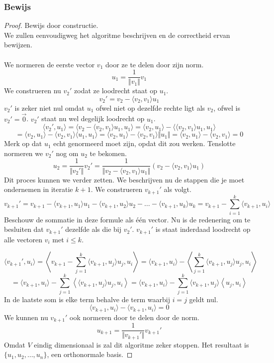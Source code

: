 \documentclass[lineaire_algebra_oplossingen.tex]{subfiles}
\begin{document}
\subsubsection*{Bewijs}
\begin{proof}
Bewijs door constructie.\\
We zullen eenvoudigweg het algoritme beschrijven en de correctheid ervan bewijzen.\\\\
We normeren de eerste vector $v_1$ door ze te delen door zijn norm.
\[
u_1 = \frac{1}{\Vert v_1\Vert}v_1
\]
We construeren nu $v_2'$ zodat ze loodrecht staat op $u_1$.
\[
v_2' = v_2 - \langle v_2,v_1\rangle u_1
\]
$v_2'$ is zeker niet nul omdat $u_1$ ofwel niet op dezelfde rechte ligt als $v_2$, ofwel is $v_2' = \vec{0}$. $v_2'$ staat nu wel degelijk loodrecht op $u_1$.
\[
\langle v_2',u_1\rangle = \langle v_2 - \langle v_2,v_1\rangle u_1,u_1\rangle = \langle v_2,u_1\rangle - \langle\langle v_2,v_1\rangle u_1,u_1\rangle
\]
\[
= \langle v_2,u_1\rangle - \langle v_2,v_1\rangle \langle u_1,u_1\rangle = \langle v_2,u_1\rangle - \langle v_2,v_1\rangle \Vert u_1\Vert = \langle v_2,u_1\rangle - \langle v_2,v_1\rangle = 0
\]
Merk op dat $u_1$ echt genormeerd moet zijn, opdat dit zou werken. Tenslotte normeren we $v_2'$ nog om $u_2$ te bekomen.
\[
u_2 = \frac{1}{\Vert v_2'\Vert}v_2' = \frac{1}{\Vert v_2 - \langle v_2,v_1\rangle u_1\Vert}(v_2 - \langle v_2,v_1\rangle u_1)
\]
Dit proces kunnen we verder zetten. We beschrijven nu de stappen die je moet ondernemen in iteratie $k+1$.
We construeren $v_{k+1}'$ als volgt.
\[
v_{k+1}' = v_{k+1} - \langle v_{k+1},u_1 \rangle u_1 - \langle v_{k+1},u_2 \rangle u_2 - \ldots - \langle v_{k+1},u_k \rangle u_k
= v_{k+1} - \sum_{i=1}^k \langle v_{k+1},u_i \rangle
\]
Beschouw de sommatie in deze formule als \'e\'en vector. Nu is de redenering om te besluiten dat $v_{k+1}'$ dezelfde als die bij $v_2'$.
$v_{k+1}'$ is staat inderdaad loodrecht op alle vectoren $v_i$ met $i\le k$.

\[
\langle v_{k+1}',u_i\rangle  = \left\langle v_{k+1} - \sum_{j=1}^k \langle v_{k+1},u_j \rangle u_j,u_i\right\rangle
=
\langle v_{k+1},u_i\rangle -
\left\langle \sum_{j=1}^k \langle v_{k+1},u_j \rangle u_j,u_i\right\rangle
\]
\[
=
\langle v_{k+1},u_i\rangle -
\sum_{j=1}^k
\left\langle  \langle v_{k+1},u_j \rangle u_j,u_i\right\rangle
=
\langle v_{k+1},u_i\rangle -
\sum_{j=1}^k
\langle v_{k+1},u_j \rangle
\left\langle u_j,u_i\right\rangle
\]
In de laatste som is elke term behalve de term waarbij $i=j$ geldt nul.
\[
\langle v_{k+1},u_i\rangle -
\langle v_{k+1},u_i\rangle
=0
\]
We kunnen nu $v_{k+1}'$ ook normeren door te delen door de norm.
\[
u_{k+1} = \frac{1}{\Vert v_{k+1}'\Vert}v_{k+1}'
\]
Omdat $V$ eindig dimensionaal is zal dit algoritme zeker stoppen. Het resultaat is $\{u_1,u_2,\ldots,u_n\}$, een orthonormale basis.
\end{proof}
\end{document}
